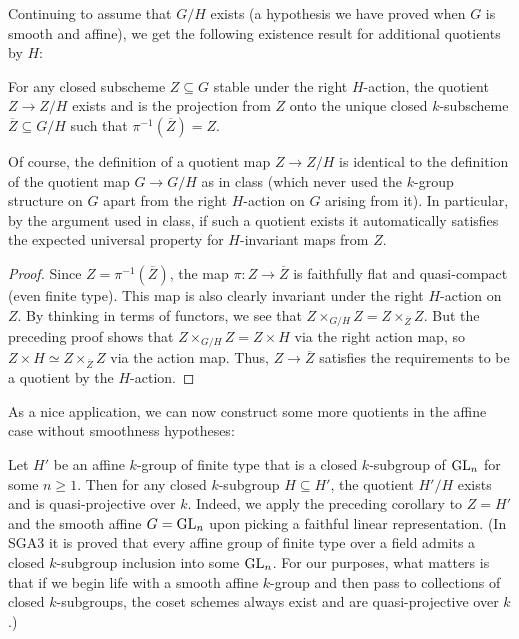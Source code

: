 \documentclass[10pt]{article}
\renewcommand{\(}{\left(}
\renewcommand{\)}{\right)}
\numberwithin{thm}{subsection}
\begin{document}
Continuing to assume that $G/H$ exists (a hypothesis we have proved when $G$ is smooth and affine),
we get the following existence result for additional quotients by $H$:

\begin{corollary}  For any closed subscheme $Z \subseteq G$ stable under
the right $H$-action, the quotient $Z \rightarrow Z/H$ exists
and is the projection from $Z$ onto the unique closed $k$-subscheme
$\overline{Z} \subseteq G/H$ such that $\pi^{-1}(\overline{Z}) = Z$. 
\end{corollary}

Of course, the definition of a quotient map $Z \rightarrow Z/H$ is identical to the
definition of the quotient map $G \rightarrow G/H$ as in class (which never used the
$k$-group structure on $G$ apart from the right $H$-action on $G$ arising from it).
In particular, by the argument used in class, if such a quotient exists it automatically
satisfies the expected universal property for $H$-invariant maps from $Z$. 

\begin{proof}
Since $Z = \pi^{-1}(\overline{Z})$, the map $\pi:Z \rightarrow \overline{Z}$ is faithfully
flat and quasi-compact (even finite type).  This map is also clearly
invariant under the right $H$-action on $Z$.  By thinking in terms of functors, we see that
$Z \times_{G/H} Z = Z \times_{\overline{Z}} Z$.  But the preceding proof shows
that $Z \times_{G/H} Z = Z \times H$ via the right action map, so
$Z \times H \simeq Z \times_{\overline{Z}} Z$ via the action map.
Thus, $Z \rightarrow \overline{Z}$ satisfies the requirements to be a quotient by the $H$-action. 
\end{proof}

As a nice application, we can now construct some more quotients in the affine case
without smoothness hypotheses:

\begin{example}\label{qt} Let $H'$ be an affine $k$-group of finite type that is a closed $k$-subgroup of
${\rm{GL}}_n$ for some $n \ge 1$.  Then for any closed $k$-subgroup $H \subseteq H'$,
the quotient $H'/H$ exists and is quasi-projective over $k$.  Indeed,
we apply the preceding corollary to $Z = H'$ and the smooth affine $G = {\rm{GL}}_n$
upon picking a faithful linear representation.  (In SGA3 it is proved that every affine
group of finite type over a field admits a closed $k$-subgroup inclusion into some
${\rm{GL}}_n$.  For our purposes, what matters is that if we begin life with a smooth
affine $k$-group and then pass to collections of closed $k$-subgroups, the coset
schemes always exist and are quasi-projective over $k$.)  
\end{example}
\end{document}
